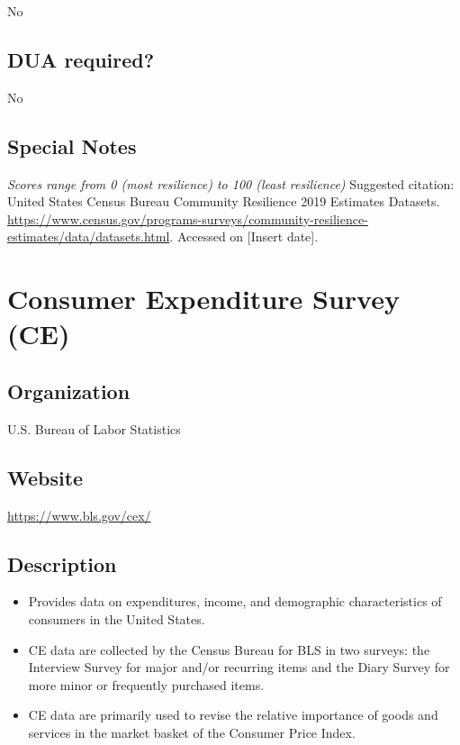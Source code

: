 \documentclass[
]{book}
\providecommand{\tightlist}{%
  \setlength{\itemsep}{0pt}\setlength{\parskip}{0pt}}
\begin{document}
No

\hypertarget{dua-required-18}{%
\section{DUA required?}\label{dua-required-18}}

No

\hypertarget{special-notes-18}{%
\section{Special Notes}\label{special-notes-18}}

\emph{Scores range from 0 (most resilience) to 100 (least resilience)
} Suggested citation: United States Census Bureau Community Resilience 2019 Estimates Datasets. \url{https://www.census.gov/programs-surveys/community-resilience-estimates/data/datasets.html}. Accessed on {[}Insert date{]}.

\mainmatter

\hypertarget{consumer-expenditure-survey-ce}{%
\chapter{Consumer Expenditure Survey (CE)}\label{consumer-expenditure-survey-ce}}

\hypertarget{organization-19}{%
\section{Organization}\label{organization-19}}

U.S. Bureau of Labor Statistics

\hypertarget{website-19}{%
\section{Website}\label{website-19}}

\url{https://www.bls.gov/cex/}

\hypertarget{description-19}{%
\section{Description}\label{description-19}}

\begin{itemize}
\tightlist
\item
  Provides data on expenditures, income, and demographic characteristics of consumers in the United States.
\item
  CE data are collected by the Census Bureau for BLS in two surveys: the Interview Survey for major and/or recurring items and the Diary Survey for more minor or frequently purchased items.
\item
  CE data are primarily used to revise the relative importance of goods and services in the market basket of the Consumer Price Index.
\end{itemize}
\end{document}

